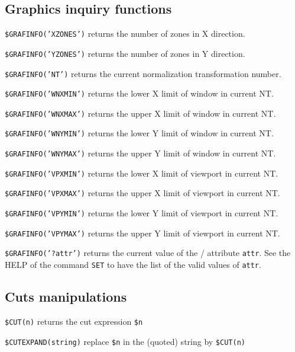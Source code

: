 \subsection{Graphics inquiry functions}
\begin{UL}
\item\texttt{\$GRAFINFO('XZONES')} returns the number of zones in X direction.
\item\texttt{\$GRAFINFO('YZONES')} returns the number of zones in Y direction.
\item\texttt{\$GRAFINFO('NT')} 
returns the current normalization transformation number.
\item\texttt{\$GRAFINFO('WNXMIN')} 
returns the lower X limit of window in current NT.
\item\texttt{\$GRAFINFO('WNXMAX')} 
returns the upper X limit of window in current NT.
\item\texttt{\$GRAFINFO('WNYMIN')} 
returns the lower Y limit of window in current NT.
\item\texttt{\$GRAFINFO('WNYMAX')} 
returns the upper Y limit of window in current NT.
\item\texttt{\$GRAFINFO('VPXMIN')} 
returns the lower X limit of viewport in current NT.
\item\texttt{\$GRAFINFO('VPXMAX')} 
returns the upper X limit of viewport in current NT.
\item\texttt{\$GRAFINFO('VPYMIN')} 
returns the lower Y limit of viewport in current NT.
\item\texttt{\$GRAFINFO('VPYMAX')} 
returns the upper Y limit of viewport in current NT.
\item\texttt{\$GRAFINFO('?attr')} returns the current value of the \HPLOT/\HIGZ{}
                              attribute \texttt{attr}. See the HELP of the command
                              \texttt{SET} to have the list of the valid values of
                              \texttt{attr}.
\end{UL}

\subsection{Cuts manipulations}
\begin{UL}
\item\texttt{\$CUT(n)} returns the cut expression \texttt{\$n}
\item\texttt{\$CUTEXPAND(string)} 
replace \texttt{\$n} in the (quoted) string by \texttt{\$CUT(n)}
\end{UL}
